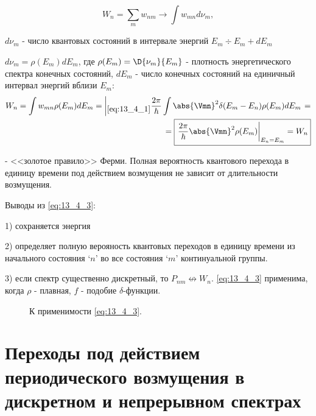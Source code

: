 $$
W_n = \sum_m w_{nm} \to \int w_{mn} d \nu_m,
$$

$d \nu_m$ - число квантовых состояний в интервале энергий $E_m \div E_m + dE_m$

$\boxed{d \nu_m = \rho(E_m) dE_m}$, где $\rho(E_m) = \D{\nu_m}{E_m}$ - плотность энергетического спектра конечных состояний, $dE_m$ - число конечных состояний на единичный интервал энергий вблизи $E_m$:
\begin{eqnarray}
W_n = \int w_{mn} \rho(E_m)dE_m = \left |_{\eqref{eq:13_4_1}} \dfrac{2\pi}{\hbar} \int \abs{\Vmn}^2 \delta(E_m - E_n) \rho(E_m)dE_m \right .= \nonumber \\
\label{eq:13_4_3} = \boxed{ \left. \frac{2\pi}{\hbar} \abs{\Vmn}^2 \rho(E_m) \right|_{E_n = E_m} = W_n}
\end{eqnarray}

- <<золотое правило>> Ферми. Полная вероятность квантового перехода в единицу времени под действием возмущения не зависит от длительности возмущения.

Выводы из \eqref{eq:13_4_3}:

1) сохраняется энергия

2) определяет полную верояность квантовых переходов в единицу времени из начального состояния `$n$' во все состояния `$m$' континуальной группы. 

3) если спектр существенно дискретный, то $P_{nm} \not \leftrightarrow W_n$. \eqref{eq:13_4_3} применима, когда $\rho$ - плавная, $f$ - подобие $\delta$-функции.

\begin{figure}[h!]
\centering
{}
\caption{К применимости \eqref{eq:13_4_3}.} \label{fig:13_4}
\end{figure}

\section{Переходы под действием периодического возмущения в дискретном и непрерывном спектрах}

